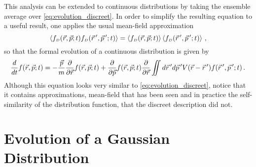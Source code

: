 This analysis can be extended to continuous distributions by taking the ensemble average over \ref{eq:evolution_discreet}.
In order to simplify the resulting equation to a useful result, one applies the usual mean-field approximation
\begin{equation}
  \left < f_{{\scriptscriptstyle D}} (\vec{r}, \vec{p}; t) f_{{\scriptscriptstyle D}} (\vec{r}\,^{\prime}, \vec{p}\,^{\prime}; t) \right > = \left < f_{{\scriptscriptstyle D}} (\vec{r}, \vec{p}; t) \right > \left < f_{{\scriptscriptstyle D}} (\vec{r}\,^{\prime}, \vec{p}\,^{\prime}; t) \right > \,\text{,}
\end{equation}
so that the formal evolution of a continuous distribution is given by
\begin{equation} \label{eq:formal_evolution}
  \frac{d}{dt} f(\vec{r}, \vec{p}; t) =
  -\frac{\vec{p}}{m} \frac{\partial}{\partial \vec{r}} f(\vec{r}, \vec{p}; t)
  + \frac{\partial}{\partial \vec{p}} f (\vec{r}, \vec{p}; t)
  \frac{\partial}{\partial \vec{r}} \iint d\vec{r}\,^{\prime} d\vec{p}\,^{\prime} V(\vec{r} - \vec{r}\,^{\prime}) f(\vec{r}\,^{\prime},\vec{p}\,^{\prime};t) \,\text{.}
\end{equation}
Although this equation looks very similar to \ref{eq:evolution_discreet}, notice that it contains approximations, mean-field that has been seen and in practice the self-similarity of the distribution function, that the discreet description did not.

\section{Evolution of a Gaussian Distribution}

